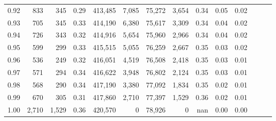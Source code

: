\begin{tabular}{rrrrrrrrrrrrrr}
0.92 &    833 &    345 &  0.29 &  413,485 &    7,085 &  75,272 &   3,654 &  0.34 &  0.05 &      0.02 \\
0.93 &    705 &    345 &  0.33 &  414,190 &    6,380 &  75,617 &   3,309 &  0.34 &  0.04 &      0.02 \\
0.94 &    726 &    343 &  0.32 &  414,916 &    5,654 &  75,960 &   2,966 &  0.34 &  0.04 &      0.02 \\
0.95 &    599 &    299 &  0.33 &  415,515 &    5,055 &  76,259 &   2,667 &  0.35 &  0.03 &      0.02 \\
0.96 &    536 &    249 &  0.32 &  416,051 &    4,519 &  76,508 &   2,418 &  0.35 &  0.03 &      0.01 \\
0.97 &    571 &    294 &  0.34 &  416,622 &    3,948 &  76,802 &   2,124 &  0.35 &  0.03 &      0.01 \\
0.98 &    568 &    290 &  0.34 &  417,190 &    3,380 &  77,092 &   1,834 &  0.35 &  0.02 &      0.01 \\
0.99 &    670 &    305 &  0.31 &  417,860 &    2,710 &  77,397 &   1,529 &  0.36 &  0.02 &      0.01 \\
1.00 &  2,710 &  1,529 &  0.36 &  420,570 &        0 &  78,926 &       0 &   nan &  0.00 &      0.00 \\
\bottomrule
\end{tabular}
